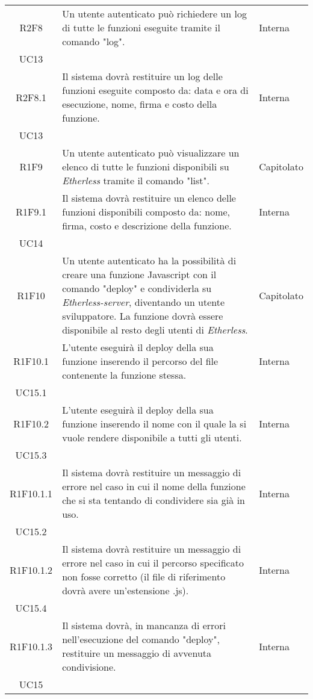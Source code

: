 \begin{longtable}{|c|p{8cm}|C{2cm}|}
	R2F8 &  Un utente autenticato può richiedere un log di tutte le funzioni eseguite tramite il comando "log". & \centering Interna \\ UC13 \tabularnewline
	
	R2F8.1 &  Il sistema dovrà restituire un log delle funzioni eseguite composto da: data e ora di esecuzione, nome, firma e costo della funzione. & \centering Interna \\ UC13 \tabularnewline
	
	R1F9 &  Un utente autenticato può visualizzare un elenco di tutte le funzioni disponibili su \textit{Etherless} tramite il comando "list". & Capitolato \\	
	
	R1F9.1 &  Il sistema dovrà restituire un elenco delle funzioni disponibili composto da: nome, firma, costo e descrizione della funzione. & \centering Interna \\ UC14 \tabularnewline
	
	R1F10 &  Un utente autenticato ha la possibilità di creare una funzione Javascript con il comando "deploy" e condividerla su \textit{Etherless-server}, diventando un utente sviluppatore. La funzione dovrà essere disponibile al resto degli utenti di \textit{Etherless}. & Capitolato \\
	
	R1F10.1 &  L'utente eseguirà il deploy della sua funzione inserendo il percorso del file contenente la funzione stessa. & \centering Interna \\ UC15.1 \tabularnewline
	
	R1F10.2 &  L'utente eseguirà il deploy della sua funzione inserendo il nome con il quale la si vuole rendere disponibile a tutti gli utenti. & \centering Interna \\ UC15.3 \tabularnewline
	
	R1F10.1.1 &  Il sistema dovrà restituire un messaggio di errore nel caso in cui il nome della funzione che si sta tentando di condividere sia già in uso. & \centering Interna \\ UC15.2 \tabularnewline
	
	R1F10.1.2 &  Il sistema dovrà restituire un messaggio di errore nel caso in cui il percorso specificato non fosse corretto (il file di riferimento dovrà avere un'estensione .js). & \centering Interna \\ UC15.4 \tabularnewline
	
	R1F10.1.3 &  Il sistema dovrà, in mancanza di errori nell'esecuzione del comando "deploy", restituire un messaggio di avvenuta condivisione. & \centering Interna \\ UC15 \tabularnewline
	

\end{longtable}

